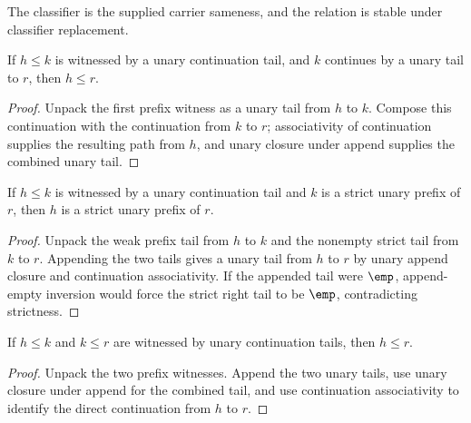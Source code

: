 \begin{definition}
\label{def:preorder-classifier-specification}
The classifier is the supplied carrier sameness, and the relation is stable under classifier replacement.
\end{definition}

\begin{theorem}
\label{thm:preorder-prefix-right-extension}
If \(h\le k\) is witnessed by a unary continuation tail, and \(k\) continues by a unary tail to \(r\), then \(h\le r\).
\end{theorem}
\begin{proof}
Unpack the first prefix witness as a unary tail from \(h\) to \(k\). Compose this continuation with the continuation from \(k\) to \(r\); associativity of continuation supplies the resulting path from \(h\), and unary closure under append supplies the combined unary tail.
\end{proof}

\begin{theorem}
\label{thm:preorder-prefix-le-strict-right-extension}
If $h\le k$ is witnessed by a unary continuation tail and $k$ is a strict
unary prefix of $r$, then $h$ is a strict unary prefix of $r$.
\end{theorem}
\begin{proof}
Unpack the weak prefix tail from $h$ to $k$ and the nonempty strict tail from
$k$ to $r$. Appending the two tails gives a unary tail from $h$ to $r$ by
unary append closure and continuation associativity. If the appended tail were
$\emp$, append-empty inversion would force the strict right tail to be
$\emp$, contradicting strictness.
\end{proof}

\begin{theorem}
\label{thm:preorder-prefix-transitivity}
If \(h\le k\) and \(k\le r\) are witnessed by unary continuation tails, then
\(h\le r\).
\end{theorem}
\begin{proof}
Unpack the two prefix witnesses. Append the two unary tails, use unary closure
under append for the combined tail, and use continuation associativity to
identify the direct continuation from \(h\) to \(r\).
\end{proof}

